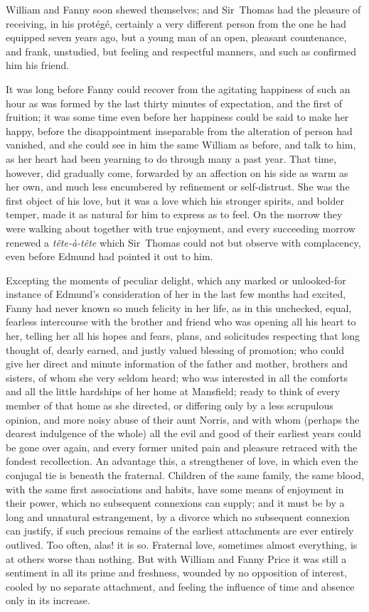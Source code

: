 William and Fanny soon shewed themselves; and Sir~Thomas had the pleasure of receiving, in his protégé, certainly a very different person from the one he had equipped seven years ago, but a young man of an open, pleasant countenance, and frank, unstudied, but feeling and respectful manners, and such as confirmed him his friend.

It was long before Fanny could recover from the agitating happiness of such an hour as was formed by the last thirty minutes of expectation, and the first of fruition; it was some time even before her happiness could be said to make her happy, before the disappointment inseparable from the alteration of person had vanished, and she could see in him the same William as before, and talk to him, as her heart had been yearning to do through many a past year. That time, however, did gradually come, forwarded by an affection on his side as warm as her own, and much less encumbered by refinement or self-distrust. She was the first object of his love, but it was a love which his stronger spirits, and bolder temper, made it as natural for him to express as to feel. On the morrow they were walking about together with true enjoyment, and every succeeding morrow renewed a \textit{tête-à-tête}  which Sir~Thomas could not but observe with complacency, even before Edmund had pointed it out to him.

Excepting the moments of peculiar delight, which any marked or unlooked-for instance of Edmund's consideration of her in the last few months had excited, Fanny had never known so much felicity in her life, as in this unchecked, equal, fearless intercourse with the brother and friend who was opening all his heart to her, telling her all his hopes and fears, plans, and solicitudes respecting that long thought of, dearly earned, and justly valued blessing of promotion; who could give her direct and minute information of the father and mother, brothers and sisters, of whom she very seldom heard; who was interested in all the comforts and all the little hardships of her home at Mansfield; ready to think of every member of that home as she directed, or differing only by a less scrupulous opinion, and more noisy abuse of their aunt Norris, and with whom (perhaps the dearest indulgence of the whole) all the evil and good of their earliest years could be gone over again, and every former united pain and pleasure retraced with the fondest recollection. An advantage this, a strengthener of love, in which even the conjugal tie is beneath the fraternal. Children of the same family, the same blood, with the same first associations and habits, have some means of enjoyment in their power, which no subsequent connexions can supply; and it must be by a long and unnatural estrangement, by a divorce which no subsequent connexion can justify, if such precious remains of the earliest attachments are ever entirely outlived. Too often, alas! it is so. Fraternal love, sometimes almost everything, is at others worse than nothing. But with William and Fanny Price it was still a sentiment in all its prime and freshness, wounded by no opposition of interest, cooled by no separate attachment, and feeling the influence of time and absence only in its increase.


